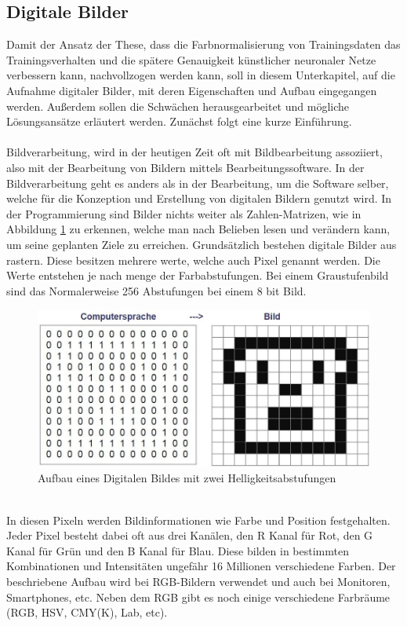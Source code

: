 \documentclass[a4paper,12pt,oneside]{article}
\begin{document}
  \subsection{Digitale Bilder}\label{s.digibilder}
  Damit der Ansatz der These, dass die Farbnormalisierung von Trainingsdaten das Trainingsverhalten und die spätere Genauigkeit künstlicher neuronaler Netze verbessern kann, nachvollzogen werden kann, soll in diesem Unterkapitel, auf die Aufnahme digitaler Bilder, mit deren Eigenschaften und Aufbau eingegangen werden. Außerdem sollen die Schwächen herausgearbeitet und mögliche Lösungsansätze erläutert werden. Zunächst folgt eine kurze Einführung.\\\\
Bildverarbeitung, wird in der heutigen Zeit oft mit Bildbearbeitung assoziiert, also mit der Bearbeitung von Bildern mittels Bearbeitungssoftware. In der Bildverarbeitung geht es anders als in der Bearbeitung, um die Software selber, welche für die Konzeption und Erstellung von digitalen Bildern genutzt wird. In der Programmierung sind Bilder nichts weiter als Zahlen-Matrizen, wie in Abbildung \ref{img:digitalesbild} zu erkennen, welche man nach Belieben lesen und verändern kann, um seine geplanten Ziele zu erreichen. Grundsätzlich bestehen digitale Bilder aus rastern. Diese besitzen mehrere werte, welche auch Pixel genannt werden. Die Werte entstehen je nach menge der Farbabstufungen. Bei einem Graustufenbild sind das Normalerweise 256 Abstufungen bei einem 8 bit Bild. 
\begin{figure}
[h]
\centering
\includegraphics[scale=0.5]{Sources/Digitalesbild.JPG}
\caption{Aufbau eines Digitalen Bildes mit zwei Helligkeitsabstufungen}
\label{img:digitalesbild}
\end{figure}\\
In diesen Pixeln werden Bildinformationen wie Farbe und Position festgehalten. Jeder Pixel besteht dabei oft aus drei Kanälen, den R Kanal für Rot, den G Kanal für Grün und den B Kanal für Blau. Diese bilden in bestimmten Kombinationen und Intensitäten ungefähr 16 Millionen verschiedene Farben. Der beschriebene Aufbau wird bei RGB-Bildern verwendet und auch bei Monitoren, Smartphones, etc. Neben dem RGB gibt es noch einige verschiedene Farbräume (RGB, HSV, CMY(K), Lab, etc).
\end{document}
